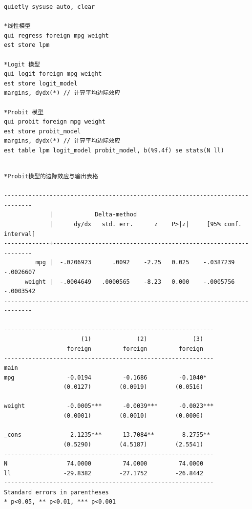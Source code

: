 \begin{tcolorbox}[title=在 Stata 中估计 Probit 模型并计算边际效应, colback=white, colframe=black, colbacktitle=white, coltitle=black,fonttitle=\bfseries]
\begin{lstlisting}[xleftmargin=2em, commentstyle=\color{black}]
quietly sysuse auto, clear

*线性模型
qui regress foreign mpg weight
est store lpm

*Logit 模型
qui logit foreign mpg weight
est store logit_model
margins, dydx(*) // 计算平均边际效应

*Probit 模型
qui probit foreign mpg weight
est store probit_model
margins, dydx(*) // 计算平均边际效应
est table lpm logit_model probit_model, b(%9.4f) se stats(N ll)
\end{lstlisting}
\vspace{-2em}
\begin{Verbatim}[commandchars=\\\{\},xleftmargin=2em]

*Probit模型的边际效应与输出表格

------------------------------------------------------------------------------
             |            Delta-method
             |      dy/dx   std. err.      z    P>|z|     [95% conf. interval]
-------------+----------------------------------------------------------------
         mpg |  -.0206923      .0092    -2.25   0.025    -.0387239   -.0026607
      weight |  -.0004649   .0000565    -8.23   0.000    -.0005756   -.0003542
------------------------------------------------------------------------------

------------------------------------------------------------
                      (1)             (2)             (3)   
                  foreign         foreign         foreign   
------------------------------------------------------------
main                                                        
mpg               -0.0194         -0.1686         -0.1040*  
                 (0.0127)        (0.0919)        (0.0516)   

weight            -0.0005***      -0.0039***      -0.0023***
                 (0.0001)        (0.0010)        (0.0006)   

_cons              2.1235***      13.7084**        8.2755** 
                 (0.5290)        (4.5187)        (2.5541)   
------------------------------------------------------------
N                 74.0000         74.0000         74.0000   
ll               -29.8382        -27.1752        -26.8442   
------------------------------------------------------------
Standard errors in parentheses
* p<0.05, ** p<0.01, *** p<0.001

\end{Verbatim}
\end{tcolorbox}

